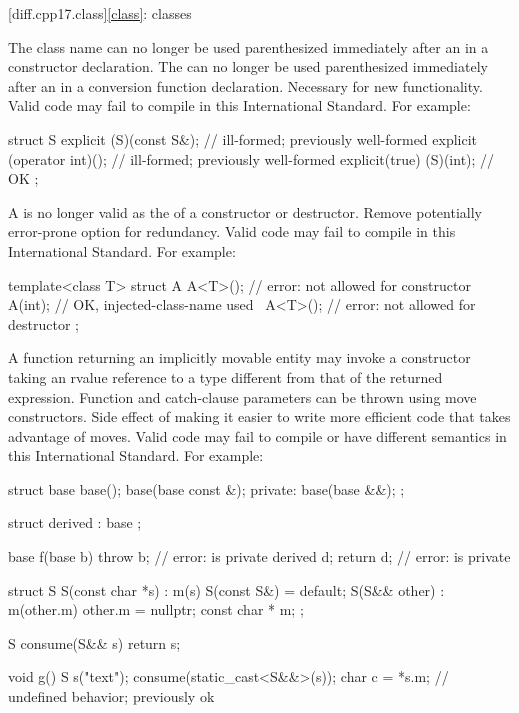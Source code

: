 [diff.cpp17.class]{\ref{class}: classes}

\change
The class name can no longer be used parenthesized
immediately after an  
in a constructor declaration.
The  can no longer be used parenthesized
immediately after an  
in a conversion function declaration.
\rationale
Necessary for new functionality.
\effect
Valid \CppXVII{} code may fail to compile
in this International Standard. For example:
\begin{codeblock}
struct S {
  explicit (S)(const S&);       // ill-formed; previously well-formed
  explicit (operator int)();    // ill-formed; previously well-formed
  explicit(true) (S)(int);      // OK
};
\end{codeblock}

\change
A 
is no longer valid as the  of a constructor or destructor.
\rationale
Remove potentially error-prone option for redundancy.
\effect
Valid \CppXVII{} code may fail to compile
in this International Standard. For example:
\begin{codeblock}
template<class T>
struct A {
  A<T>();           // error:  not allowed for constructor
  A(int);           // OK, injected-class-name used
  ~A<T>();          // error:  not allowed for destructor
};
\end{codeblock}

\change
A function returning an implicitly movable entity
may invoke a constructor taking an rvalue reference to a type
different from that of the returned expression.
Function and catch-clause parameters can be thrown using move constructors.
\rationale
Side effect of making it easier to write
more efficient code that takes advantage of moves.
\effect
Valid \CppXVII{} code may fail to compile or have different semantics
in this International Standard.
For example:
\begin{codeblock}
struct base {
  base();
  base(base const &);
private:
  base(base &&);
};

struct derived : base {};

base f(base b) {
  throw b;                      // error:  is private
  derived d;
  return d;                     // error:  is private
}

struct S {
  S(const char *s) : m(s) { }
  S(const S&) = default;
  S(S&& other) : m(other.m) { other.m = nullptr; }
  const char * m;
};

S consume(S&& s) { return s; }

void g() {
  S s("text");
  consume(static_cast<S&&>(s));
  char c = *s.m;                // undefined behavior; previously ok
}
\end{codeblock}

